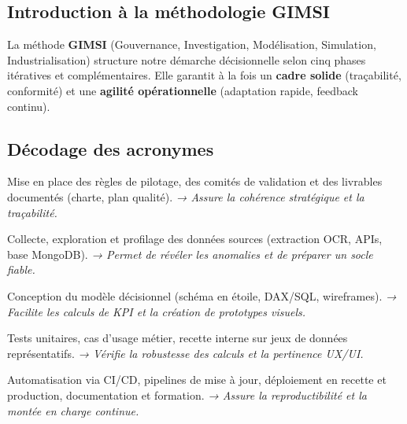 \documentclass[a4paper,11pt]{report}
\begin{document}
\subsection*{Introduction à la méthodologie GIMSI}

La méthode \textbf{GIMSI} (Gouvernance, Investigation, Modélisation, Simulation, Industrialisation) structure notre démarche décisionnelle selon cinq phases itératives et complémentaires.  
Elle garantit à la fois un \textbf{cadre solide} (traçabilité, conformité) et une \textbf{agilité opérationnelle} (adaptation rapide, feedback continu).

\subsection*{Décodage des acronymes}

\begin{description}[leftmargin=2cm, style=nextline]
  \item[\textbf{Gouvernance}]  
    Mise en place des règles de pilotage, des comités de validation et des livrables documentés (charte, plan qualité).  
    \emph{→ Assure la cohérence stratégique et la traçabilité.}

  \item[\textbf{Investigation}]  
    Collecte, exploration et profilage des données sources (extraction OCR, APIs, base MongoDB).  
    \emph{→ Permet de révéler les anomalies et de préparer un socle fiable.}

  \item[\textbf{Modélisation}]  
    Conception du modèle décisionnel (schéma en étoile, DAX/SQL, wireframes).  
    \emph{→ Facilite les calculs de KPI et la création de prototypes visuels.}

  \item[\textbf{Simulation}]  
    Tests unitaires, cas d’usage métier, recette interne sur jeux de données représentatifs.  
    \emph{→ Vérifie la robustesse des calculs et la pertinence UX/UI.}

  \item[\textbf{Industrialisation}]  
    Automatisation via CI/CD, pipelines de mise à jour, déploiement en recette et production, documentation et formation.  
    \emph{→ Assure la reproductibilité et la montée en charge continue.}
\end{description}
\end{document}
